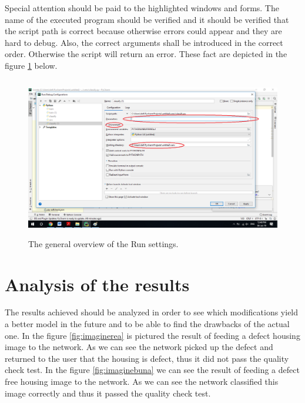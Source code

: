 \documentclass[12pt,a4paper,twoside]{report}
\begin{document}
Special attention should be paid to the highlighted windows and forms. The name of the executed program should be verified and it should be verified that the script path is correct because otherwise errors could appear and they are hard to debug. Also, the correct arguments shall be introduced in the correct order. Otherwise the script will return an error. These fact are depicted in the figure \ref{fig:run3} below.
\begin{figure}[h!]
	\centering
	\includegraphics[width=12cm, height=7cm]{img/data/imagerun3.png}
	\caption[]
	{The general overview of the Run settings.}
	\label{fig:run3}
\end{figure}

\section{Analysis of the results} 
The results achieved should be analyzed in order to see which modifications yield a better model in the future and to be able to find the drawbacks of the actual one. In the figure \ref{fig:imaginerea} is pictured the result of feeding a defect housing image to the network. As we can see the network picked up the defect and returned to the user that the housing is defect, thus it did not pass the quality check test. In the figure \ref{fig:imaginebuna} we can see the result of feeding a defect free housing image to the network. As we can see the network classified this image correctly and thus it passed the quality check test.
\end{document}
